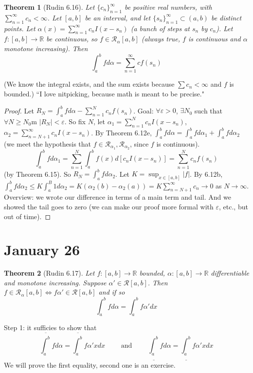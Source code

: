 \documentclass{article}
\theoremstyle{plain}
\newtheorem{theorem}{Theorem}
\theoremstyle{remark}
\newcommand{\R}{{\mathbb R}}
\newcommand{\ep}{{\varepsilon}}
\begin{document}
\begin{theorem}[Rudin 6.16]
	Let $\{c_n\}_{n=1}^\infty$ be positive real numbers, with $\sum_{n=1}^\infty c_n < \infty$.
	Let $[a,b]$ be an interval, and let $\{s_n\}_{n=1}^\infty \subset (a,b)$
	be distinct points.
	Let $\alpha(x) = \sum_{n=1}^\infty c_nI(x-s_n)$
	(a bunch of steps at $s_n$ by $c_n$).
	Let $f \colon [a,b] \to \R$ be continuous,
	so $f \in \mathcal{R}_\alpha[a,b]$
	(always true, $f$ is continuous and $\alpha$ monotone increasing).
	Then
	\[
		\int_a^b fd\alpha = \sum_{n=1}^\infty cf(s_n)
	\]
\end{theorem}
(We know the integral exists,
and the sum exists because $\sum c_n < \infty$ and $f$ is bounded.)
``I love nitpicking, because math is meant to be precise."
\begin{proof}
	Let $R_N = \int_a^bfd\alpha - \sum_{n=1}^N c_nf(s_n)$.
	Goal: $\forall \ep > 0$, $\exists N_0$ such that
	$\forall N \geq N_0$m $\lvert R_N \rvert < \ep$.
	So fix $N$, let $\alpha_1 = \sum_{n=1}^N c_nI(x-s_n)$,
	$\alpha_2 = \sum_{n=N+1}^\infty c_n I(x-s_n)$.
	By Theorem 6.12e, $\int_a^b fd\alpha = \int_a^b fd\alpha_1 + \int_a^bfd\alpha_2$
	(we meet the hypothesis that $f \in \mathcal{R}_{\alpha_1},\mathcal{R}_{\alpha_2}$,
	since $f$ is continuous).
	\[
		\int_a^b fd\alpha_1 = \sum_{n=1}^N \int_a^b f(x) d[c_nI(x-s_n)]
		= \sum_{n=1}^N c_n f(s_n)
	\]
	(by Theorem 6.15).
	So $R_N = \int_a^b fd\alpha_2$.
	Let $K = \sup_{x \in [a,b]} \lvert f \rvert$.
	By 6.12b, $\int_a^b fd\alpha_2 \leq K \int_a^B 1 d\alpha_2
	= K(\alpha_2(b) - \alpha_2(a)) = K\sum_{n=N+1}^\infty c_n \to 0$ as $N \to \infty$.
	Overview: we wrote our difference in terms of a main term and tail.
	And we showed the tail goes to zero
	(we can make our proof more formal with $\ep$, etc., but out of time).
\end{proof}

\section{January 26}
\begin{theorem}[Rudin 6.17]
	Let $f \colon [a,b] \to \R$ bounded, $\alpha \colon [a,b] \to \R$
	differentiable and monotone increasing.
	Suppose $\alpha' \in \mathcal{R}[a,b]$.
	Then $f \in \mathcal{R}_\alpha[a,b] \iff f\alpha' \in \mathcal{R}[a,b]$
	and if so
	\[
		\int_a^b fd\alpha = \int_a^b f\alpha' dx
	\]
\end{theorem}
Step 1: it sufficies to show that
\[
	\overline{\int_a^b}fd\alpha = \overline{\int_a^b}f\alpha' xdx
	\qquad \text{ and } \qquad
	\underline{\int_a^b}fd\alpha = \underline{\int_a^b}f\alpha'xdx
\]
We will prove the first equality, second one is an exercise.
\end{document}
